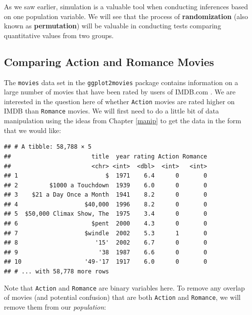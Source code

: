 \documentclass[]{tufte-book}
\newenvironment{Shaded}{\begin{snugshade}}{\end{snugshade}}
\newcommand{\KeywordTok}[1]{\textcolor[rgb]{0.13,0.29,0.53}{\textbf{{#1}}}}
\newcommand{\StringTok}[1]{\textcolor[rgb]{0.31,0.60,0.02}{{#1}}}
\newcommand{\NormalTok}[1]{{#1}}
\begin{document}
As we saw earlier, simulation is a valuable tool when conducting
inferences based on one population variable. We will see that the
process of \textbf{randomization} (also known as \textbf{permutation})
will be valuable in conducting tests comparing quantitative values from
two groups.

\subsection{Comparing Action and Romance
Movies}\label{comparing-action-and-romance-movies}

The \texttt{movies} data set in the \texttt{ggplot2movies} package
contains information on a large number of movies that have been rated by
users of IMDB.com \citep{R-ggplot2movies}. We are interested in the
question here of whether \texttt{Action} movies are rated higher on IMDB
than \texttt{Romance} movies. We will first need to do a little bit of
data manipulation using the ideas from Chapter \ref{manip} to get the
data in the form that we would like:

\begin{Shaded}
\end{Shaded}

\begin{verbatim}
## # A tibble: 58,788 × 5
##                       title  year rating Action Romance
##                       <chr> <int>  <dbl>  <int>   <int>
## 1                         $  1971    6.4      0       0
## 2         $1000 a Touchdown  1939    6.0      0       0
## 3    $21 a Day Once a Month  1941    8.2      0       0
## 4                   $40,000  1996    8.2      0       0
## 5  $50,000 Climax Show, The  1975    3.4      0       0
## 6                     $pent  2000    4.3      0       0
## 7                   $windle  2002    5.3      1       0
## 8                      '15'  2002    6.7      0       0
## 9                       '38  1987    6.6      0       0
## 10                  '49-'17  1917    6.0      0       0
## # ... with 58,778 more rows
\end{verbatim}

Note that \texttt{Action} and \texttt{Romance} are binary variables
here. To remove any overlap of movies (and potential confusion) that are
both \texttt{Action} and \texttt{Romance}, we will remove them from our
\emph{population}:
\end{document}
